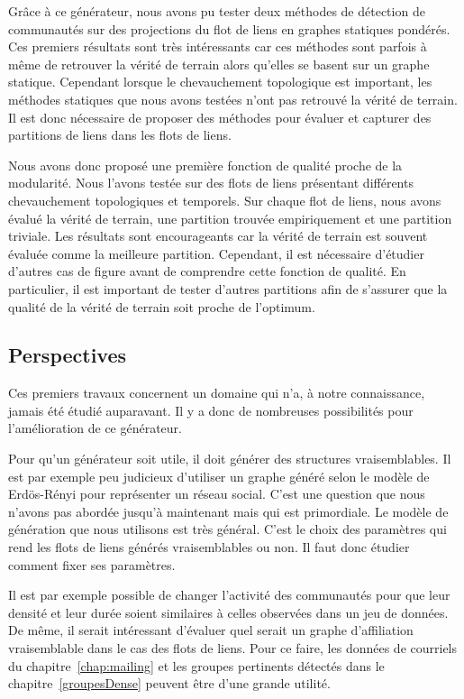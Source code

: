 \bigskip

Grâce à ce générateur, nous avons pu tester deux méthodes de détection de communautés sur des projections du flot de liens en graphes statiques pondérés.
Ces premiers résultats sont très intéressants car ces méthodes sont parfois à même de retrouver la vérité de terrain alors qu'elles se basent sur un graphe statique.
Cependant lorsque le chevauchement topologique est important, les méthodes statiques que nous avons testées n'ont pas retrouvé la vérité de terrain.
Il est donc nécessaire de proposer des méthodes pour évaluer et capturer des partitions de liens dans les flots de liens.

\bigskip

Nous avons donc proposé une première fonction de qualité proche de la modularité.
Nous l'avons testée sur des flots de liens présentant différents chevauchement topologiques et temporels.
Sur chaque flot de liens, nous avons évalué la vérité de terrain, une partition trouvée empiriquement et une partition triviale.
Les résultats sont encourageants car la vérité de terrain est souvent évaluée comme la meilleure partition.
Cependant, il est nécessaire d'étudier d'autres cas de figure avant de comprendre cette fonction de qualité.
En particulier, il est important de tester d'autres partitions afin de s'assurer que la qualité de la vérité de terrain soit proche de l'optimum.


\subsection{Perspectives}
Ces premiers travaux concernent un domaine qui n'a, à notre connaissance, jamais été étudié auparavant.
Il y a donc de nombreuses possibilités pour l'amélioration de ce générateur.


Pour qu'un générateur soit utile, il doit générer des structures vraisemblables.
Il est par exemple peu judicieux d'utiliser un graphe généré selon le modèle de Erdös-Rényi pour représenter un réseau social.
C'est une question que nous n'avons pas abordée jusqu'à maintenant mais qui est primordiale.
Le modèle de génération que nous utilisons est très général.
C'est le choix des paramètres qui rend les flots de liens générés vraisemblables ou non.
Il faut donc étudier comment fixer ses paramètres.

Il est par exemple possible de changer l'activité des communautés pour que leur densité et leur durée soient similaires à celles observées dans un jeu de données.
De même, il serait intéressant d'évaluer quel serait un graphe d'affiliation vraisemblable dans le cas des flots de liens.
Pour ce faire, les données de courriels du chapitre~\ref{chap:mailing} et les groupes pertinents détectés dans le chapitre~\ref{groupesDense} peuvent être d'une grande utilité.

